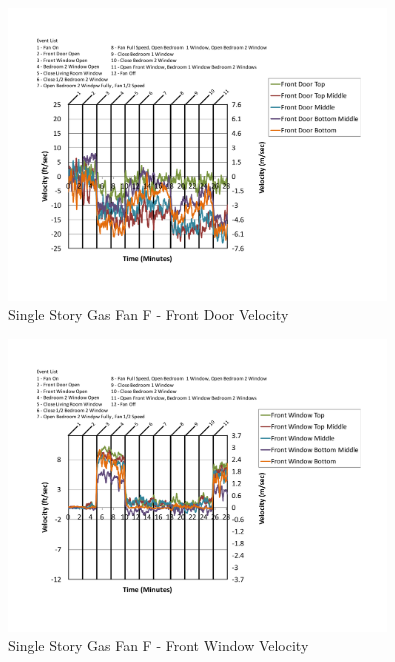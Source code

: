 \documentclass{article}
\begin{document}
\begin{appendices}
	\begin{figure}[H]
		\centering
		\includegraphics[height=3.05in,trim=0.67in 1.1in 0.67in 0.8in,clip=true]{0_Images/Results_Charts/ColdFlow/Single_Story/Gas/F/Front_Door_Velocity.pdf}
		\caption{Single Story Gas Fan F - Front Door Velocity}
	\end{figure}
 

	\begin{figure}[H]
		\centering
		\includegraphics[height=3.05in,trim=0.67in 1.1in 0.67in 0.8in,clip=true]{0_Images/Results_Charts/ColdFlow/Single_Story/Gas/F/Front_Window_Velocity.pdf}
		\caption{Single Story Gas Fan F - Front Window Velocity}
	\end{figure}
 
	\clearpage


\end{appendices}
\end{document}
